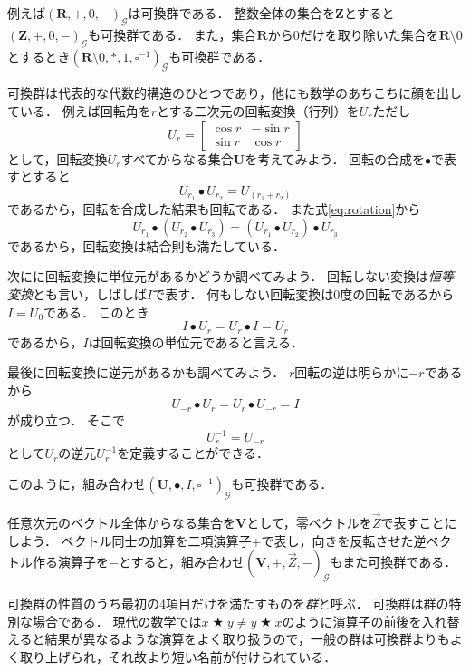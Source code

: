 \documentclass[twocolumn]{jsbook}
\newcommand{\keyword}[1]{\emph{#1}}
\DeclareMathOperator{\mathAnyBinaryOperator}{\bigstar}
\newcommand{\mathSomething}{\square}
\newcommand{\mathSet}[1]{\mathbf{#1}}
\newcommand{\mathVector}[1]{\vec{#1}}
\newcommand{\mathGroup}[4]{(#1,#2,#3,#4)_\mathcal{G}}
\begin{document}
例えば$\mathGroup{\mathSet{R}}{+}{0}{-}$は可換群である．
整数全体の集合を$\mathSet{Z}$とすると$\mathGroup{\mathSet{Z}}{+}{0}{-}$も可換群である．
また，集合$\mathSet{R}$から$0$だけを取り除いた集合を$\mathSet{R}\setminus0$とするとき$\mathGroup{\mathSet{R}\setminus0}{*}{1}{\mathSomething^{-1}}$も可換群である．

可換群は代表的な代数的構造のひとつであり，他にも数学のあちこちに顔を出している．
例えば回転角を$r$とする二次元の回転変換（行列）を$U_r$ただし$$U_r=\begin{bmatrix}\cos r&-\sin r\\\sin r&\cos r\end{bmatrix}$$として，回転変換$U_r$すべてからなる集合$\mathSet{U}$を考えてみよう．
回転の合成を$\bullet$で表すとすると
\begin{equation}
\label{eq:rotation}
U_{r_1}\bullet U_{r_2}=U_{(r_1+r_2)}
\end{equation}
であるから，回転を合成した結果も回転である．
また式\eqref{eq:rotation}から$$U_{r_1}\bullet\left(U_{r_2}\bullet U_{r_3}\right)=\left(U_{r_1}\bullet U_{r_2}\right)\bullet U_{r_3}$$
であるから，回転変換は結合則も満たしている．

次にに回転変換に単位元があるかどうか調べてみよう．
回転しない変換は\keyword{恒等変換}とも言い，しばしば$I$で表す．
何もしない回転変換は$0$度の回転であるから$I=U_0$である．
このとき$$I\bullet U_r=U_r\bullet I=U_r$$であるから，$I$は回転変換の単位元であると言える．

最後に回転変換に逆元があるかも調べてみよう．
$r$回転の逆は明らかに$-r$であるから$$U_{-r}\bullet U_r=U_r\bullet U_{-r}=I$$が成り立つ．
そこで$$U_{r}^{-1}=U_{-r}$$として$U_r$の逆元$U_r^{-1}$を定義することができる．

このように，組み合わせ$\mathGroup{\mathSet{U}}{\bullet}{I}{\mathSomething^{-1}}$も可換群である．

任意次元のベクトル全体からなる集合を$\mathSet{V}$として，零ベクトルを$\mathVector{Z}$で表すことにしよう．
ベクトル同士の加算を二項演算子$+$で表し，向きを反転させた逆ベクトル作る演算子を$-$とすると，組み合わせ$\mathGroup{\mathSet{V}}{+}{\mathVector{Z}}{-}$もまた可換群である．

可換群の性質のうち最初の4項目だけを満たすものを\keyword{群}と呼ぶ．
可換群は群の特別な場合である．
現代の数学では$x\mathAnyBinaryOperator y\neq y\mathAnyBinaryOperator x$のように演算子の前後を入れ替えると結果が異なるような演算をよく取り扱うので，一般の群は可換群よりもよく取り上げられ，それ故より短い名前が付けられている．
\end{document}
